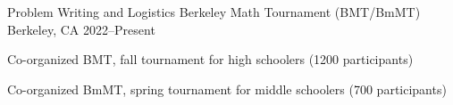 \experience
{Problem Writing and Logistics}
{Berkeley Math Tournament (BMT/BmMT)}
{Berkeley, CA}
{2022--Present}
{
	\item Co-organized BMT, fall tournament for high schoolers (1200 participants)
	\item Co-organized BmMT, spring tournament for middle schoolers (700 participants)
}

